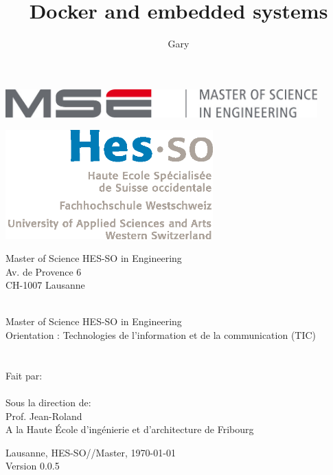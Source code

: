 \documentclass[11pt,a4paper,oneside]{report}
\title{Docker and embedded systems}
\author{Gary \bsc{Marigliano}}
\newcommand{\school}{Haute École d'ingénierie et d'architecture de Fribourg}
\newcommand{\version}{0.0.5}
\begin{document}
\begin{titlepage}
\selectfont
\begin{flushright}
\begin{minipage}{0.5\textwidth}
\begin{flushleft}
\includegraphics[width=0.9\textwidth]{./img/mse_logo}
\end{flushleft}
\end{minipage}%
\begin{minipage}{0.5\textwidth}
\begin{flushright}
\includegraphics[width=0.6\textwidth]{./img/logo_hes-so}
\end{flushright}
\end{minipage}
\begin{flushleft}
\footnotesize
Master of Science HES-SO in Engineering \\
Av. de Provence 6 \\
CH-1007 Lausanne
\end{flushleft}
~\\[0.5cm]

\Huge Master of Science HES-SO in Engineering\\[0.5cm]

\LARGE Orientation : Technologies de l’information et de la communication (TIC)\\[0.5cm]
~\\[1cm]
{
\Huge \MakeUppercase{\thetitle} \\[2.5cm]
}
{
\normalsize
Fait par:\\
\Huge \theauthor \\[0.5cm]
}
{
\normalsize
Sous la direction de: \\
Prof. Jean-Roland  \\
A la \school
}
\vfill

{\normalsize Lausanne, HES-SO//Master, \today \\
Version \version}

\end{flushright}
\end{titlepage}
\end{document}
